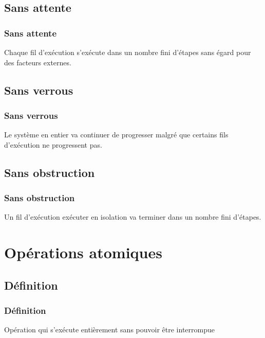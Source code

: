 \documentclass{beamer}
\begin{document}

\subsection{Sans attente}
\begin{frame}[fragile]
\frametitle{Sans attente}
Chaque fil d'exécution s'exécute dans un nombre fini d'étapes sans égard pour des facteurs externes.

\end{frame}


\subsection{Sans verrous}
\begin{frame}[fragile]
\frametitle{Sans verrous}
Le système en entier va continuer de progresser malgré que certains fils d'exécution ne progressent pas.

\end{frame}


\subsection{Sans obstruction}
\begin{frame}[fragile]
\frametitle{Sans obstruction}
Un fil d'exécution exécuter en isolation va terminer dans un nombre fini d'étapes.

\end{frame}

\section{Opérations atomiques}
\subsection{Définition}
\begin{frame}[fragile]
\frametitle{Définition}
Opération qui s'exécute entièrement sans pouvoir être interrompue
\end{frame}
\end{document}
